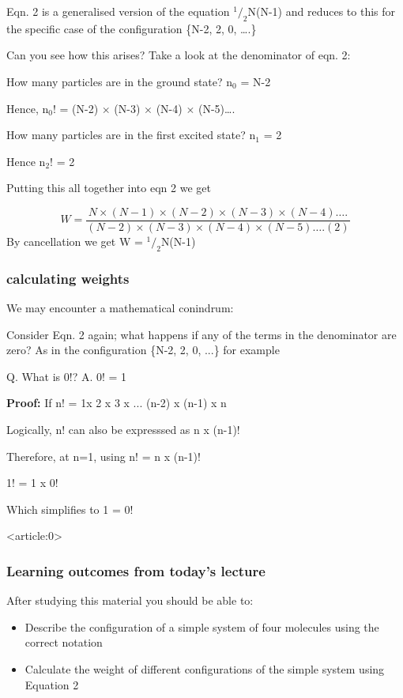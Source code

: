 \documentclass[a4paper,12pt,titlepage]{article}
\begin{document}
\begin{frame}[allowframebreaks]
Eqn. 2 is a generalised version of the equation \(^1/_2\)N(N-1) and reduces to this for the specific case of the configuration 
\{N-2, 2, 0, ….\}\par\medskip
 
Can you see how this arises?\newline
Take a look at the denominator of eqn. 2:\par\medskip
 
How many particles are in the ground state?  n\(_0\) = N-2\par\smallskip
Hence,  n\(_0\)!  = (N-2) \(\times\) (N-3) \(\times\) (N-4) \(\times\) (N-5)….\par\medskip
 
How many particles are in the first excited state? n\(_1\) = 2\par\medskip
 
Hence n\(_2\)!  = 2\par\medskip
 
Putting this all together into eqn 2 we get \par\medskip
 
\[W = \frac{N\times(N-1)\times(N-2)\times(N-3)\times(N-4)….}{(N-2)\times(N-3)\times(N-4)\times(N-5)…. (2)}\]
\medskip
By cancellation we get \quad W = \(^1/_2\)N(N-1)
\end{frame}

\begin{frame}[allowframebreaks]
\frametitle{calculating weights}
We may encounter a mathematical conindrum:  

Consider Eqn. 2 again; what happens if any of the terms in the denominator are zero? As in the configuration \{N-2, 2, 0, ...\} for example  

Q. What is 0!?\newline
A. 0! = 1

\textbf{Proof:}\newline
If n! = 1x 2 x 3 x ... (n-2) x (n-1) x n  

Logically, n! can also be expresssed as n x (n-1)!  

Therefore, at n=1, using n! = n x (n-1)!  

1! = 1 x 0!

Which simplifies to 1 = 0!
\end{frame}


\begin{frame}<article:0>
\frametitle{Learning outcomes from today's lecture}
After studying this material you should be able to:
\begin{itemize}
\item Describe the configuration of a simple system of four molecules using the correct notation
\item Calculate the weight of different configurations of the simple system using Equation 2
\end{itemize}
\end{frame}
\end{document}
